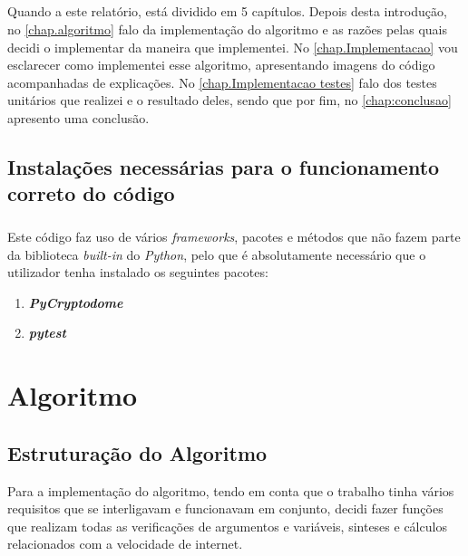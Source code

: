 \documentclass{report}
\begin{document}
\paragraph{}
Quando a este relatório, está dividido em 5 capítulos. Depois desta introdução, no \autoref{chap.algoritmo} falo da implementação do algoritmo e as razões pelas quais decidi o implementar da maneira que implementei. No \autoref{chap.Implementacao} vou esclarecer como implementei esse algoritmo, apresentando imagens do código acompanhadas de explicações. \newline
No \autoref{chap.Implementacao testes} falo dos testes unitários que realizei e o resultado deles, sendo que por fim, no \autoref{chap:conclusao} apresento uma conclusão.

\section{Instalações necessárias para o funcionamento correto do código}
\paragraph{}
Este código faz uso de vários \textit{frameworks}, pacotes e métodos que não fazem parte da biblioteca \textit{\textit{built-in}} do \textit{Python}\cite{Python}, pelo que é absolutamente necessário que o utilizador tenha instalado os seguintes pacotes:
\begin{enumerate}
	\item \textbf{\textit{PyCryptodome}} \cite{PyCryptodome}
    \item \textbf{\textit{pytest}} \cite{Pytest}
\end{enumerate}
 


\chapter{Algoritmo}
\label{chap.algoritmo}

\section{Estruturação do Algoritmo}
Para a implementação do algoritmo, tendo em conta que o trabalho tinha vários requisitos que se interligavam e funcionavam em conjunto, decidi fazer funções que realizam todas as verificações de argumentos e variáveis, sinteses e cálculos relacionados com a velocidade de internet. 
\end{document}
